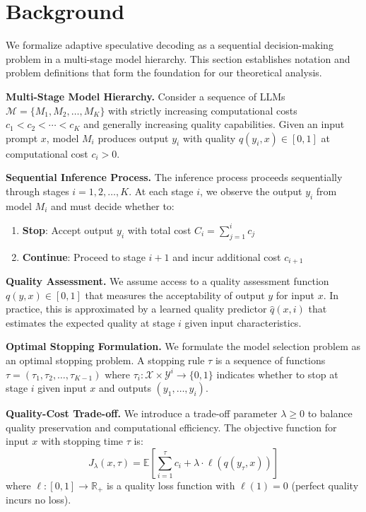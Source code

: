 \documentclass{article}
\theoremstyle{plain}
\theoremstyle{definition}
\theoremstyle{remark}
\begin{document}
\section{Background}
\label{sec:background}
We formalize adaptive speculative decoding as a sequential decision-making problem in a multi-stage model hierarchy. This section establishes notation and problem definitions that form the foundation for our theoretical analysis.

\textbf{Multi-Stage Model Hierarchy.} Consider a sequence of LLMs $\mathcal{M} = \{M_1, M_2, \ldots, M_K\}$ with strictly increasing computational costs $c_1 < c_2 < \cdots < c_K$ and generally increasing quality capabilities. Given an input prompt $x$, model $M_i$ produces output $y_i$ with quality $q(y_i, x) \in [0,1]$ at computational cost $c_i > 0$.

\textbf{Sequential Inference Process.} The inference process proceeds sequentially through stages $i = 1, 2, \ldots, K$. At each stage $i$, we observe the output $y_i$ from model $M_i$ and must decide whether to:
\begin{enumerate}
\item \textbf{Stop}: Accept output $y_i$ with total cost $C_i = \sum_{j=1}^{i} c_j$
\item \textbf{Continue}: Proceed to stage $i+1$ and incur additional cost $c_{i+1}$
\end{enumerate}

\textbf{Quality Assessment.} We assume access to a quality assessment function $q(y, x) \in [0,1]$ that measures the acceptability of output $y$ for input $x$. In practice, this is approximated by a learned quality predictor $\hat{q}(x, i)$ that estimates the expected quality at stage $i$ given input characteristics.

\textbf{Optimal Stopping Formulation.} We formulate the model selection problem as an optimal stopping problem. A stopping rule $\tau$ is a sequence of functions $\tau = (\tau_1, \tau_2, \ldots, \tau_{K-1})$ where $\tau_i: \mathcal{X} \times \mathcal{Y}^i \rightarrow \{0,1\}$ indicates whether to stop at stage $i$ given input $x$ and outputs $(y_1, \ldots, y_i)$.

\textbf{Quality-Cost Trade-off.} We introduce a trade-off parameter $\lambda \geq 0$ to balance quality preservation and computational efficiency. The objective function for input $x$ with stopping time $\tau$ is:
\begin{equation}
J_\lambda(x, \tau) = \mathbb{E}\left[\sum_{i=1}^{\tau} c_i + \lambda \cdot \ell(q(y_\tau, x))\right]
\label{eq:objective}
\end{equation}
where $\ell: [0,1] \rightarrow \mathbb{R}_+$ is a quality loss function with $\ell(1) = 0$ (perfect quality incurs no loss).
\end{document}
